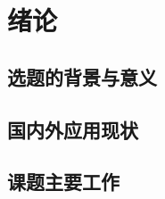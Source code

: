 \documentclass{ecnuthesis}
\begin{document}
    \frontmatter

    \begin{abstract}
    \end{abstract}

    \begin{abstractEN}
    \end{abstractEN}

    \mainmatter


    \chapter{绪论}\label{ch:intro}


    \section{选题的背景与意义}\label{sec:background}


    \section{国内外应用现状}\label{sec:status}


    \section{课题主要工作}\label{sec:work}


    \backmatter
    \PrintReference

    \begin{appendix}
    \end{appendix}

    \begin{acknowledgement}
    \end{acknowledgement}
\end{document}
